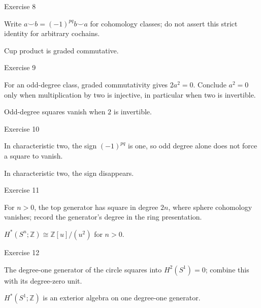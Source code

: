 \begin{exercise}\label{exr:viii29-08}
Exercise 8
\end{exercise}
\begin{hint}
Write \(a\smile b=(-1)^{pq}b\smile a\) for cohomology classes; do not assert this strict identity for arbitrary cochains.
\end{hint}
\begin{solution}
Cup product is graded commutative.
\end{solution}

\begin{exercise}\label{exr:viii29-09}
Exercise 9
\end{exercise}
\begin{hint}
For an odd-degree class, graded commutativity gives \(2a^2=0\). Conclude \(a^2=0\) only when multiplication by two is injective, in particular when two is invertible.
\end{hint}
\begin{solution}
Odd-degree squares vanish when \(2\) is invertible.
\end{solution}

\begin{exercise}\label{exr:viii29-10}
Exercise 10
\end{exercise}
\begin{hint}
In characteristic two, the sign \((-1)^{pq}\) is one, so odd degree alone does not force a square to vanish.
\end{hint}
\begin{solution}
In characteristic two, the sign disappears.
\end{solution}

\begin{exercise}\label{exr:viii29-11}
Exercise 11
\end{exercise}
\begin{hint}
For \(n>0\), the top generator has square in degree \(2n\), where sphere cohomology vanishes; record the generator's degree in the ring presentation.
\end{hint}
\begin{solution}
\(H^*(S^n;\mathbb Z)\cong\mathbb Z[u]/(u^2)\) for \(n>0\).
\end{solution}

\begin{exercise}\label{exr:viii29-12}
Exercise 12
\end{exercise}
\begin{hint}
The degree-one generator of the circle squares into \(H^2(S^1)=0\); combine this with its degree-zero unit.
\end{hint}
\begin{solution}
\(H^*(S^1;\mathbb Z)\) is an exterior algebra on one degree-one generator.
\end{solution}


